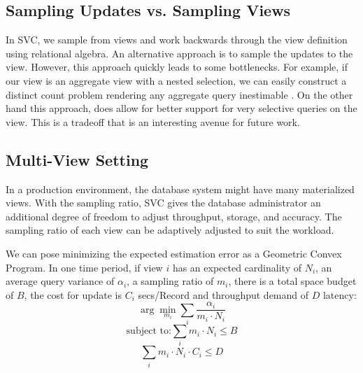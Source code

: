 \subsection{Sampling Updates vs. Sampling Views}
In SVC, we sample from views and work backwards through the view definition using relational algebra.
An alternative approach is to sample the updates to the view.
However, this approach quickly leads to some bottlenecks.
For example, if our view is an aggregate view with a nested selection, we can easily construct a distinct count problem rendering any aggregate query inestimable \cite{DBLP:conf/pods/CharikarCMN00}.
On the other hand this approach, does allow for better support for very selective queries on the view. 
This is a tradeoff that is an interesting avenue for future work.

\subsection{Multi-View Setting}

In a production environment, the database system might have many materialized views. 
With the sampling ratio, SVC gives the database administrator an additional degree of freedom to adjust throughput, storage, and accuracy.
The sampling ratio of each view can be adaptively adjusted to suit the workload.


We can pose minimizing the expected estimation error as a Geometric Convex Program.
In one time period, if view $i$ has an expected cardinality of $N_i$, an average query variance of $\alpha_i$, a sampling ratio of $m_i$, there is a total space budget of $B$, the cost for update is $C_i$ secs/Record and throughput demand of $D$ latency:
\[\arg \min_{m_i} \sum_i \frac{\alpha_i}{m_i \cdot N_i}\]
\[\text{subject to:} \sum_i m_i \cdot N_i \le B \]
\[\sum_i m_i\cdot N_i \cdot C_i \le D \]




